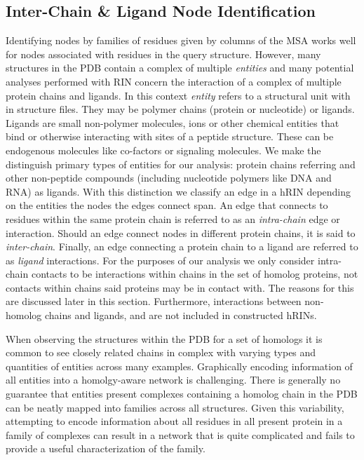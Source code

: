 \subsection{Inter-Chain \& Ligand Node Identification}
\label{subsec:node-types}
Identifying nodes by families of residues given by columns of the MSA works well for nodes associated with residues in the query structure. However, many structures in the PDB contain a complex of multiple \emph{entities} and many potential analyses performed with RIN concern the interaction of a complex of multiple protein chains and ligands. 
In this context \emph{entity} refers to a structural unit with in structure files. They may be polymer chains (protein or nucleotide) or ligands. 
Ligands are small non-polymer molecules, ions or other chemical entities that bind or otherwise interacting with sites of a peptide structure. These can be endogenous molecules like co-factors or signaling molecules.
We make the distinguish primary types of entities for our analysis: protein chains referring and other non-peptide compounds (including nucleotide polymers like DNA and RNA) as ligands. 
With this distinction we classify an edge in a hRIN depending on the entities the nodes the edges connect span. An edge that connects to residues within the same protein chain is referred to as an \emph{intra-chain} edge or interaction. 
Should an edge connect nodes in different protein chains, it is said to \emph{inter-chain}. Finally, an edge connecting a protein chain to a ligand are referred to as \emph{ligand} interactions. 
For the purposes of our analysis we only consider intra-chain contacts to be interactions within chains in the set of homolog proteins, not contacts within chains said proteins may be in contact with. The reasons for this are discussed later in this section.
Furthermore, interactions between non-homolog chains and ligands, and are not included in constructed hRINs. %


When observing the structures within the PDB for a set of homologs it is common to see closely related chains in complex with varying types and quantities of entities across many examples. 
Graphically encoding information of all entities into a homolgy-aware network is challenging. 
There is generally no guarantee that entities present complexes containing a homolog chain in the PDB can be neatly mapped into families across all structures. Given this variability, attempting to encode information about all residues in all present protein in a family of complexes can result in a network that is quite complicated and fails to provide a useful characterization of the family. 

